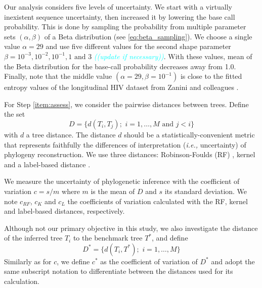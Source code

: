 \documentclass[10pt]{article}
\newcommand{\comment}[1]{\textsl{\textcolor{cyan}{((#1))}}}
\newcommand{\ie}{\textit{i.e.,}\xspace}
\begin{document}
Our analysis considers five levels of uncertainty. We start with a virtually inexistent sequence uncertainty, then increased it by lowering the base call probability. This is done by sampling the probability from multiple parameter sets $(\alpha,\beta)$ of a Beta distribution (see \autoref{eq:beta_sampling}). 
We choose a single value $\alpha=29$ and use five different values for the second shape parameter $\beta = 10^{-3}, 10^{-2}, 10^{-1}, 1 \text{ and } 3$ \comment{update if necessary}.
With these values, mean of the Beta distribution for the base-call probability decreases away from 1.0. 
Finally, note that the middle value $(\alpha=29, \beta=10^{-1})$ is close to the fitted entropy values of the longitudinal HIV dataset from Zanini and colleagues \cite{Zanini:2015}.

For Step \ref{item:assess}, we consider the pairwise distances between trees. 
Define the set 
\begin{equation}
D = \{d(T_i,T_j);\,\, i=1,\ldots, M \text{ and } j<i \}
\end{equation}
with $d$ a tree distance. 
The distance $d$ should be a statistically-convenient metric that represents faithfully the differences of interpretation (\ie uncertainty) of phylogeny reconstruction. 
We use three distances:  Robinson-Foulds (RF) \cite{Robinson:1981}, kernel \cite{Poon:2013} and a label-based distance \cite{xxx}. 

We measure the uncertainty of phylogenetic inference with the coefficient of variation $c = s / m$ where $m$ is the mean of $D$ and $s$ its standard deviation.
We note $c_{RF}$, $c_K$ and $c_{L}$ the coefficients of variation calculated with the RF, kernel and label-based distances, respectively.

Although not our primary objective in this study, we also investigate the distance of the inferred tree $T_i$ to the benchmark tree $T^*$, and define 
\begin{equation}
D^* = \{d(T_i,T^*);\,\, i=1,\ldots, M \} 
\end{equation}
Similarly as for $c$, we define $c^*$ as the coefficient of variation of $D^*$ and adopt the same subscript notation to differentiate between the distances used for its calculation.
\end{document}
